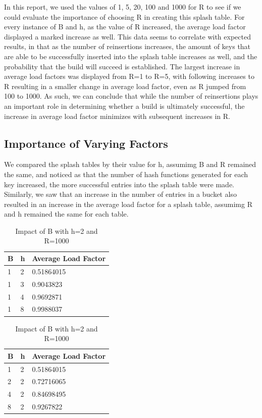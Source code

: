 \documentclass[11pt]{article}
\begin{document}
In this report, we used the values of 1, 5, 20, 100 and 1000 for R to see if we could evaluate the importance of choosing R in creating this splash table. 
For every instance of B and h, as the value of R increased, the average load factor displayed a marked increase as well.
This data seems to correlate with expected results, in that as the number of reinsertions increases, the amount of keys that are able to be successfully inserted into the splash table increases as well, and the probability that the build will succeed is established. 
The largest increase in average load factors was displayed from R=1 to R=5, with following increases to R resulting in a smaller change in average load factor, even as R jumped from 100 to 1000.
As such, we can conclude that while the number of reinsertions plays an important role in determining whether a build is ultimately successful, the increase in average load factor minimizes with subsequent increases in R. 

\subsection*{Importance of Varying Factors}
We compared the splash tables by their value for h, assumimg B and R remained the same, and noticed as that the number of hash functions generated for each key increased, the more successful entries into the splash table were made.
Similarly, we saw that an increase in the number of entries in a bucket also resulted in an increase in the average load factor for a splash table, assumimg R and h remained the same for each table. 

\begin{table}
\parbox{.45\linewidth}{
\centering
\small
\begin{tabular}{|l|l|l|}
\hline
\textbf{B} & \textbf{h} & \textbf{Average Load Factor} \\ \hline
1          & 2              &0.51864015 \\ \hline
1          & 3                 &0.9043823 \\ \hline
1          & 4             &0.9692871 \\ \hline
1          & 8                 &0.9988037 \\ \hline
\end{tabular}
\caption{Impact of h with B=1 and R=1000}}
\hfill
\parbox{.45\linewidth}{
\centering
\small
\begin{tabular}{|l|l|l|}
\hline
\textbf{B} & \textbf{h} & \textbf{Average Load Factor} \\ \hline
1          & 2            &0.51864015 \\ \hline
2          & 2            &0.72716065 \\ \hline
4          & 2            &0.84698495 \\ \hline
8          & 2            &0.9267822 \\ \hline
\end{tabular}
\caption{Impact of B with h=2 and R=1000}}
\end{table}
\end{document}
